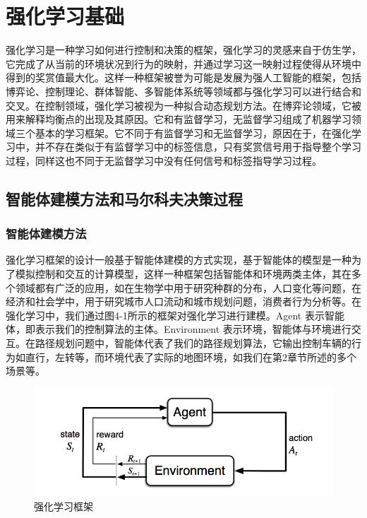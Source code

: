 \documentclass{standalone}
\begin{document}
\chapter{强化学习基础}

强化学习是一种学习如何进行控制和决策的框架，强化学习的灵感来自于仿生学，它完成了从当前的环境状况到行为的映射，并通过学习这一映射过程使得从环境中得到的奖赏值最大化。这样一种框架被誉为可能是发展为强人工智能的框架，包括博弈论、控制理论、群体智能、多智能体系统等领域都与强化学习可以进行结合和交叉。在控制领域，强化学习被视为一种拟合动态规划方法。在博弈论领域，它被用来解释均衡点的出现及其原因。它和有监督学习，无监督学习组成了机器学习领域三个基本的学习框架。它不同于有监督学习和无监督学习，原因在于，在强化学习中，并不存在类似于有监督学习中的标签信息，只有奖赏信号用于指导整个学习过程，同样这也不同于无监督学习中没有任何信号和标签指导学习过程。\par

\section{智能体建模方法和马尔科夫决策过程}
\subsection{智能体建模方法}
强化学习框架的设计一般基于智能体建模的方式实现，基于智能体的模型是一种为了模拟控制和交互的计算模型，这样一种框架包括智能体和环境两类主体，其在多个领域都有广泛的应用，如在生物学中用于研究种群的分布，人口变化等问题，在经济和社会学中，用于研究城市人口流动和城市规划问题，消费者行为分析等。在强化学习中，我们通过图4-1所示的框架对强化学习进行建模。Agent 表示智能体，即表示我们的控制算法的主体。Environment 表示环境，智能体与环境进行交互。在路径规划问题中，智能体代表了我们的路径规划算法，它输出控制车辆的行为如直行，左转等，而环境代表了实际的地图环境，如我们在第2章节所述的多个场景等。
\begin{figure}[H]
	\includegraphics[width=12.0cm]{pic/4-1.png}
	\caption{强化学习框架}
	\label{4-1}
\end{figure}
\end{document}
